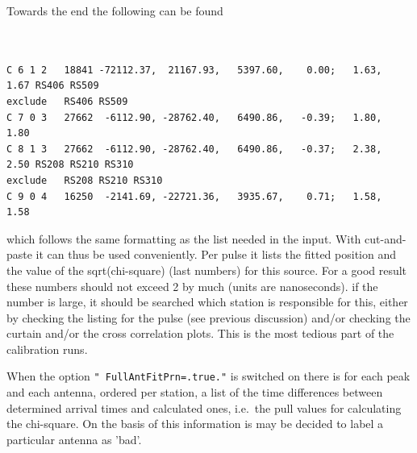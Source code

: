 Towards the end the following can be found

\begin{linenumbers}
\tiny
\resetlinenumber
\begin{verbatim}


C 6 1 2   18841 -72112.37,  21167.93,   5397.60,    0.00;   1.63,   1.67 RS406 RS509
exclude   RS406 RS509
C 7 0 3   27662  -6112.90, -28762.40,   6490.86,   -0.39;   1.80,   1.80
C 8 1 3   27662  -6112.90, -28762.40,   6490.86,   -0.37;   2.38,   2.50 RS208 RS210 RS310
exclude   RS208 RS210 RS310
C 9 0 4   16250  -2141.69, -22721.36,   3935.67,    0.71;   1.58,   1.58
\end{verbatim}
\end{linenumbers}

which follows the same formatting as the list needed in the input. With cut-and-paste it can thus be used conveniently. Per pulse it lists the fitted position and the value of the sqrt(chi-square) (last numbers) for this source. For a good result these numbers should not exceed 2 by much (units are nanoseconds). if the number is large, it should be searched which station is responsible for this, either by checking the listing for the pulse (see previous discussion) and/or checking the curtain and/or the cross correlation plots. This is the most tedious part of the calibration runs.

When the option \verb#" FullAntFitPrn=.true."# is switched on there is for each peak and each antenna, ordered per station, a list of the time differences between determined arrival times and calculated ones, i.e.\ the pull values for calculating the chi-square. On the basis of this information is may be decided to label a particular antenna as 'bad'. 